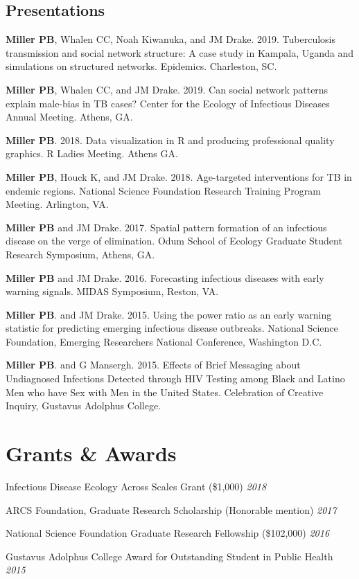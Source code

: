 \documentclass[letterpaper]{article}
\renewenvironment{itemize}{
  \begin{list}{}{
    \setlength{\leftmargin}{1.5em}
  }
}{
  \end{list}
}
\begin{document}
\subsection*{Presentations}
\begin{itemize}
\item  \textbf{Miller PB}, Whalen CC, Noah Kiwanuka, and JM Drake. 2019. Tuberculosis transmission and social network structure: A case study in Kampala, Uganda and simulations on structured networks. Epidemics. Charleston, SC. 
\item  \textbf{Miller PB}, Whalen CC, and JM Drake. 2019. Can social network patterns explain male-bias in TB cases? Center for the Ecology of Infectious Diseases Annual Meeting. Athens, GA.
\item \textbf{Miller PB}. 2018. Data visualization in R and producing professional quality graphics. R Ladies Meeting. Athens GA. 
\item   \textbf{Miller PB}, Houck K, and JM Drake. 2018. Age-targeted interventions for TB in endemic regions. National Science Foundation Research Training Program Meeting. Arlington, VA. 
\item  \textbf{Miller PB} and JM Drake. 2017. Spatial pattern formation of an infectious disease on the verge of elimination. Odum School of Ecology Graduate Student Research Symposium, Athens, GA. 
\item \textbf{Miller PB} and JM Drake. 2016. Forecasting infectious diseases with early warning signals. MIDAS Symposium, Reston, VA. 
\item \textbf{Miller PB}. and JM Drake. 2015. Using the power ratio as an early warning statistic for predicting emerging infectious disease outbreaks. National Science Foundation, Emerging Researchers National Conference, Washington D.C.
\item \textbf{Miller PB}. and G Mansergh. 2015. Effects of Brief Messaging about Undiagnosed Infections Detected through HIV Testing among Black and Latino Men who have Sex with Men in the United States. Celebration of Creative Inquiry, Gustavus Adolphus College.
\end{itemize}

\section*{Grants \& Awards}
\begin{itemize}
\item Infectious Disease Ecology Across Scales Grant (\$1,000) \hfill \textit{2018} 
\item ARCS Foundation, Graduate Research Scholarship (Honorable mention) \hfill \textit{2017} 
\item National Science Foundation Graduate Research Fellowship (\$102,000) \hfill \textit{2016} 
\item Gustavus Adolphus College Award for Outstanding Student in Public Health \hfill \textit{2015} 
\end{itemize}
\end{document}
